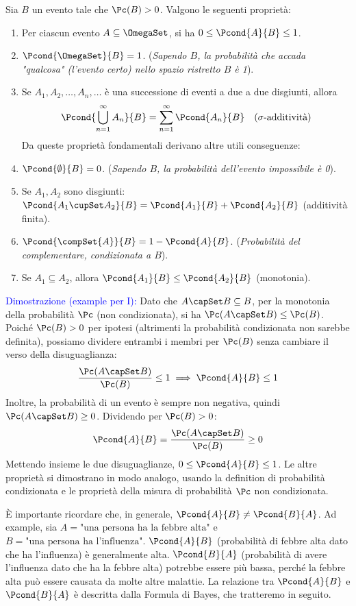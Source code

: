 \begin{theorem}
Sia $B$ un evento tale che $\Pc(B)>0$. Valgono le seguenti proprietà:
\begin{enumerate}[label=\Roman*)]
    \item Per ciascun evento $A \subseteq \OmegaSet$, si ha $0 \le \Pcond{A}{B} \le 1$.
    \item $\Pcond{\OmegaSet}{B} = 1$. (\textit{Sapendo $B$, la probabilità che accada "qualcosa" (l'evento certo) nello spazio ristretto $B$ è 1}).
    \item Se $A_1, A_2, \dots, A_n, \dots$ è una successione di eventi a due a due disgiunti, allora
    \[ \Pcond{\bigcup_{n=1}^\infty A_n}{B} = \sum_{n=1}^\infty \Pcond{A_n}{B} \quad (\sigma\text{-additività}) \]
    Da queste proprietà fondamentali derivano altre utili conseguenze:
    \item $\Pcond{\emptyset}{B} = 0$. (\textit{Sapendo $B$, la probabilità dell'evento impossibile è 0}).
    \item Se $A_1, A_2$ sono disgiunti: $\Pcond{A_1 \cupSet A_2}{B} = \Pcond{A_1}{B} + \Pcond{A_2}{B}$ (additività finita).
    \item $\Pcond{\compSet{A}}{B} = 1 - \Pcond{A}{B}$. (\textit{Probabilità del complementare, condizionata a $B$}).
    \item Se $A_1 \subseteq A_2$, allora $\Pcond{A_1}{B} \le \Pcond{A_2}{B}$ (monotonia).
\end{enumerate}
\end{theorem}
\textcolor{blue}{Dimostrazione (example per I):}
Dato che $A \capSet B \subseteq B$, per la monotonia della probabilità $\Pc$ (non condizionata), si ha $\Pc(A \capSet B) \le \Pc(B)$.
Poiché $\Pc(B)>0$ per ipotesi (altrimenti la probabilità condizionata non sarebbe definita), possiamo dividere entrambi i membri per $\Pc(B)$ senza cambiare il verso della disuguaglianza:
\[ \frac{\Pc(A \capSet B)}{\Pc(B)} \le 1 \implies \Pcond{A}{B} \le 1 \]
Inoltre, la probabilità di un evento è sempre non negativa, quindi $\Pc(A \capSet B) \ge 0$. Dividendo per $\Pc(B) > 0$:
\[ \Pcond{A}{B} = \frac{\Pc(A \capSet B)}{\Pc(B)} \ge 0 \]
Mettendo insieme le due disuguaglianze, $0 \le \Pcond{A}{B} \le 1$. Le altre proprietà si dimostrano in modo analogo, usando la definition di probabilità condizionata e le proprietà della misura di probabilità $\Pc$ non condizionata.

\begin{remark}
È importante ricordare che, in generale, $\Pcond{A}{B} \neq \Pcond{B}{A}$.
Ad example, sia $A = \text{"una persona ha la febbre alta"}$ e $B = \text{"una persona ha l'influenza"}$.
$\Pcond{A}{B}$ (probabilità di febbre alta dato che ha l'influenza) è generalmente alta.
$\Pcond{B}{A}$ (probabilità di avere l'influenza dato che ha la febbre alta) potrebbe essere più bassa, perché la febbre alta può essere causata da molte altre malattie.
La relazione tra $\Pcond{A}{B}$ e $\Pcond{B}{A}$ è descritta dalla Formula di Bayes, che tratteremo in seguito.
\end{remark}


